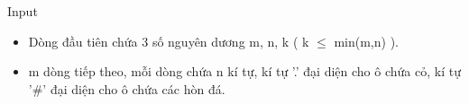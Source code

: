 Input
\begin{itemize}
	\item     Dòng đầu tiên chứa 3 số nguyên dương m, n, k ( k  $\le$  min(m,n) ).   
	\item     m dòng tiếp theo, mỗi dòng chứa n kí tự, kí tự '.' đại diện cho ô chứa cỏ, kí tự '\#' đại diện cho ô chứa các hòn đá.   
\end{itemize}
